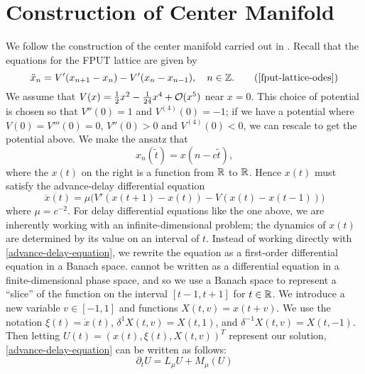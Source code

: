
\section{Construction of Center Manifold}
We follow the construction of the center manifold carried out in \cite{iooss2000travelling}. Recall that the equations for the FPUT lattice are given by
\begin{equation*}
	\ddot x_n = V'(x_{n+1} - x_n) - V'(x_n - x_{n-1}), \quad n \in \Z. \tag{\ref{fput-lattice-odes}}
\end{equation*}
We assume that \(V(x) = \frac 12 x^2 - \frac 1 {24} x^4 + \mathcal{O}(x^5)\) near \(x=0\). This choice of potential is chosen so that \(V''(0) = 1\) and \(V^{(4)}(0) = -1\); if we have a potential where \(V(0) = V'''(0)=0\), \(V''(0) > 0\) and \(V^{(4)}(0)< 0\), we can rescale to get the potential above. We make the ansatz that 
\begin{equation*}
	x_n(\tilde t) = x(n-c\tilde t),
\end{equation*}
where the \(x(t)\) on the right is a function from \(\mathbb{R}\) to \(\mathbb{R}\). Hence \(x(t)\) must satisfy the advance-delay differential equation
\begin{equation}\label{advance-delay-equation}
	\ddot x (t) = \mu \Big(V'(x(t+1) - x(t)) - V(x(t) - x(t-1)) \Big)
\end{equation}
where \(\mu = c^{-2}\). For delay differential equations like the one above, we are inherently working with an infinite-dimensional problem; the dynamics of \(x(t)\) are determined by its value on an interval of \(t\). Instead of working directly with \cref{advance-delay-equation}, we rewrite the equation as a first-order differential equation in a Banach space.  cannot be written as a differential equation in a finite-dimensional phase space, and so we use a Banach space to represent a ``slice'' of the function on the interval \([t-1,t+1]\) for \(t\in\mathbb{R}\). We introduce a new variable \(v\in[-1,1]\) and functions \(X(t,v) = x(t+v)\). We use the notation \(\xi(t) = \dot x(t)\), \(\delta^1X(t,v) = X(t,1)\), and \(\delta^{-1} X(t,v) = X(t,-1)\). Then letting \(U(t) = (x(t), \xi(t), X(t,v))^T\) represent our solution, \cref{advance-delay-equation} can be written as follows:
\begin{equation}\label{first-order-abstract-ode}
	\partial_t U = L_\mu U + M_\mu (U)
\end{equation}
